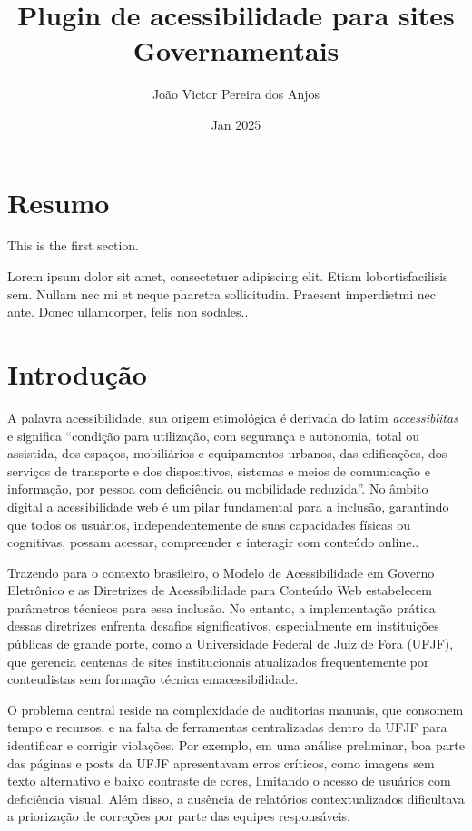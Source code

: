 \documentclass[12pt]{article}
\title{Plugin de acessibilidade para sites Governamentais}
\author{João Victor Pereira dos Anjos}
\date{Jan 2025}
\begin{document}
\maketitle
  
\tableofcontents

\section{Resumo}
   
This is the first section.
      
Lorem  ipsum  dolor  sit  amet,  consectetuer  adipiscing  
elit.   Etiam  lobortisfacilisis sem.  Nullam nec mi et 
neque pharetra sollicitudin.  Praesent imperdietmi nec ante. 
Donec ullamcorper, felis non sodales..

\section{Introdução}

A palavra acessibilidade, sua origem etimológica é derivada do 
latim \textit{accessiblitas} e significa ``condição para utilização, com segurança e
autonomia, total ou assistida, dos espaços, mobiliários e equipamentos urbanos, das 
edificações, dos serviços de transporte e dos dispositivos, sistemas e meios de 
comunicação e informação, por pessoa com deficiência ou mobilidade reduzida''\cite{Acessibilidade}.
No âmbito digital a acessibilidade web é um pilar fundamental para a inclusão, 
garantindo que todos os usuários, independentemente de suas capacidades físicas ou 
cognitivas, possam acessar, compreender e interagir com conteúdo online.\cite{wcag22}. 

Trazendo para o contexto brasileiro, o Modelo de Acessibilidade em Governo 
Eletrônico\cite{emag} e as Diretrizes de Acessibilidade para Conteúdo Web\cite{wcag22} 
estabelecem parâmetros técnicos para essa inclusão. No entanto, a implementação 
prática dessas diretrizes enfrenta desafios significativos, especialmente em 
instituições públicas de grande porte, como a Universidade Federal de Juiz de Fora 
(UFJF), que gerencia centenas de sites institucionais atualizados frequentemente por 
conteudistas sem formação técnica emacessibilidade.

O problema central reside na complexidade de auditorias manuais, que consomem
tempo e recursos, e na falta de ferramentas centralizadas dentro da UFJF para
identificar e corrigir violações. Por exemplo, em uma análise preliminar, boa parte 
das páginas e posts da UFJF apresentavam erros críticos, como imagens sem texto
alternativo e baixo contraste de cores, limitando o acesso de usuários com deficiência
visual. Além disso, a ausência de relatórios contextualizados dificultava a 
priorização de correções por parte das equipes responsáveis.
\end{document}
